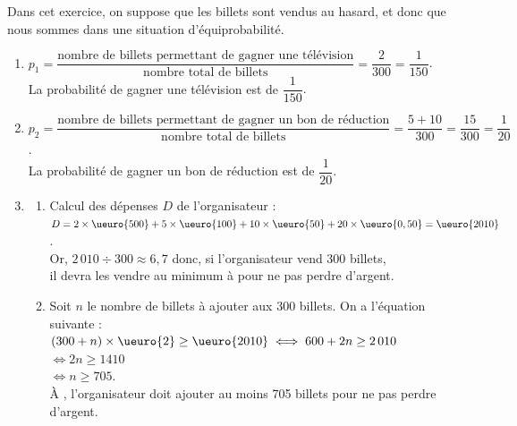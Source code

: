 \begin{corrige}
   Dans cet exercice, on suppose que les billets sont vendus au hasard, et donc que nous sommes dans une situation d'équiprobabilité. \\ [1mm]
   \begin{enumerate}
      \item $p_1 =\dfrac{\text{nombre de billets permettant de gagner une télévision}}{\text{nombre total de billets}} =\dfrac{2}{300} =\dfrac{1}{150}$. \\ [2mm]
         {\blue La probabilité de gagner une télévision est de $\dfrac{1}{150}$}. \\ [2mm]
      \item $p_2 =\dfrac{\text{nombre de billets permettant de gagner un bon de réduction}}{\text{nombre total de billets}} =\dfrac{5+10}{300} =\dfrac{15}{300} =\dfrac{1}{20}$. \\ [2mm]
         {\blue La probabilité de gagner un bon de réduction est de $\dfrac{1}{20}$}. \smallskip
   \item
      \begin{enumerate}
         \item Calcul des dépenses $D$ de l'organisateur : \\
            $D =2\times\ueuro{500}+5\times\ueuro{100}+10\times\ueuro{50} +20\times\ueuro{0,50} =\ueuro{2010}$. \\
            Or, $2\,010\div300 \approx6,7$ donc, si l'organisateur vend 300 billets, \\
            {\blue il devra les vendre au minimum à  pour ne pas perdre d'argent}. \\
         \item Soit $n$ le nombre de billets à ajouter aux 300 billets. On a l'équation suivante : \\
            $(300+n)\times\ueuro{2} \geq\ueuro{2010} \iff 600+2n\geq2\,010$ \\
            \hspace*{3.7cm} $\iff 2n \geq1410$ \\
            \hspace*{3.7cm} $\iff n\geq705$. \\
            {\blue À , l'organisateur doit ajouter au moins 705 billets pour ne pas perdre d'argent}.
      \end{enumerate}
   \end{enumerate}
\end{corrige}

\bigskip


